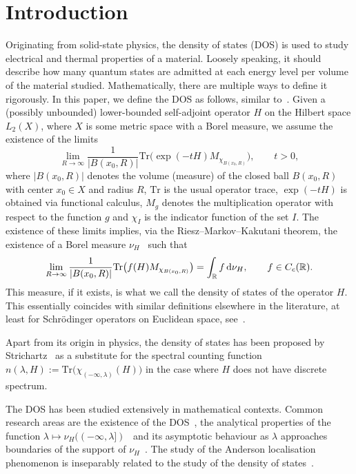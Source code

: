 \documentclass[pdftex]{sigma}
\numberwithin{equation}{section}
\begin{document}
\section{Introduction}
Originating from solid-state physics, the density of states (DOS) is used to study electrical and thermal properties of a material. Loosely speaking, it should describe how many quantum states are admitted at each energy level per volume of the material studied. Mathematically, there are multiple ways to define it rigorously. In this paper, we define the DOS as follows, similar to~\mbox{\cite[Section C]{Simon1982}}. Given a (possibly unbounded) lower-bounded self-adjoint operator $H$ on the Hilbert space $L_2(X)$, where $X$ is some metric space with a Borel measure, we assume the existence of the limits
\[
\lim_{R\to \infty} \frac{1}{|B(x_0,R)|}\mathrm{Tr}\bigl(\exp(-tH)M_{\chi_{B(x_0,R)}}\bigr), \qquad t>0,
\]
where $|B(x_0,R)|$ denotes the volume (measure) of the closed ball $B(x_0,R)$ with center $x_0 \in X$ and radius $R$, $\mathrm{Tr}$ is the usual operator trace, $\exp(-tH)$ is obtained via functional calculus, $M_g$ denotes the multiplication operator with respect to the function $g$ and $\chi_{I}$ is the indicator function of the set $I$. The existence of these limits implies, via the Riesz--Markov--Kakutani theorem, the existence of a Borel measure $\nu_H$~\cite[Proposition C.7.2]{Simon1982} such that
\[
\lim_{R\to \infty} \frac{1}{|B(x_0,R)|}\mathrm{Tr}\big(f(H)M_{\chi_{B(x_0,R)}}\big) = \int_{\mathbb{R}}f \,{\rm d}\nu_H, \qquad f\in C_c(\mathbb{R}).
\]
This measure, if it exists, is what we call the density of states of the operator $H.$ This essentially coincides with similar definitions elsewhere in the literature, at least for Schr\"odinger operators on Euclidean space, see~\cite{Simon1982}.

Apart from its origin in physics, the density of states has been proposed by Strichartz~\cite{Strichartz2012} as a substitute for the spectral counting function $n(\lambda,H) := \mathrm{Tr}\big(\chi_{(-\infty,\lambda)}(H)\big)$ in the case where $H$ does not have discrete spectrum.

The DOS has been studied extensively in mathematical contexts. Common research areas are the existence of the DOS~\cite{AizenmanWarzel2015, BerezinShubin1991, CarmonaLacroix1990, DoiIwatsuka2001, PasturFigotin1992, Shubin1979, Simon1982}, the analytical properties of the function $\lambda \mapsto \nu_H((-\infty, \lambda])$~\cite{AizenmanWarzel2015, BourgainKlein2013, CarmonaLacroix1990, PasturFigotin1992} and its asymptotic behaviour as $\lambda$ approaches boundaries of the support of $\nu_H$~\cite{AizenmanWarzel2015, BourgainKlein2013, CarmonaLacroix1990, Lang1991, PasturFigotin1992}. The study of the Anderson localisation phenomenon is inseparably related to the study of the density of states~\cite{AizenmanWarzel2015, CarmonaLacroix1990, Lang1991}.
\end{document}
